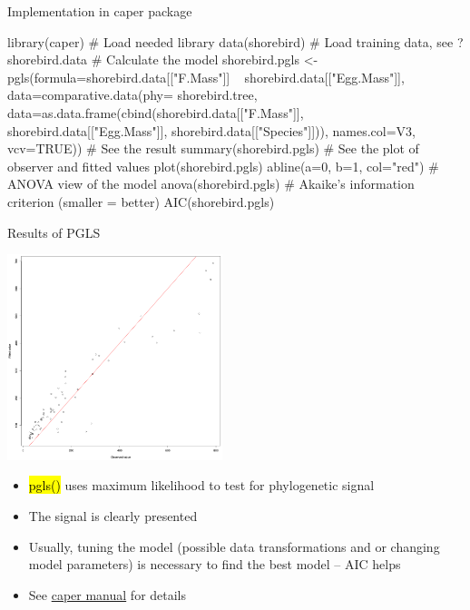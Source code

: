 \documentclass[compress, ucs, xelatex, 11pt, xcolor=svgnames,
  hyperref={
    bookmarks=true,
    unicode=true,
    colorlinks=true,
    pdftitle={Molecular data in R},
    plainpages=false,
    pdfauthor={Vojtech Zeisek},
    pdfsubject={Course about phylogeny and evolution in R},
    pdfcreator={XeLaTeX},
    pdfkeywords={R, evolution, phylogeny, molecular data},
    linkcolor=Tomato,
    anchorcolor=SaddleBrown,
    citecolor=Goldenrod,
    filecolor=DarkMagenta,
    menucolor=Sienna,
    urlcolor=DarkTurquoise,
    pdftex},
  url={hyphens, lowtilde} %
  ]{beamer}
\renewcommand{\texttt}[1]{\hl{\ttfamily #1}}
\begin{document}
\begin{frame}[fragile]{Implementation in caper package}
  \begin{spluscode}
    library(caper) # Load needed library
    data(shorebird) # Load training data, see ?shorebird.data
    # Calculate the model
    shorebird.pgls <- pgls(formula=shorebird.data[["F.Mass"]] ~
      shorebird.data[["Egg.Mass"]], data=comparative.data(phy=
      shorebird.tree, data=as.data.frame(cbind(shorebird.data[["F.Mass"]],
      shorebird.data[["Egg.Mass"]], shorebird.data[["Species"]])),
      names.col=V3, vcv=TRUE))
    # See the result
    summary(shorebird.pgls)
    # See the plot of observer and fitted values
    plot(shorebird.pgls)
    abline(a=0, b=1, col="red")
    # ANOVA view of the model
    anova(shorebird.pgls)
    # Akaike's information criterion (smaller = better)
    AIC(shorebird.pgls)
  \end{spluscode}
\end{frame}

\begin{frame}[fragile]{Results of PGLS}
  \begin{multicols}{2}
    \includegraphics[height=6cm]{shorebirds.png}
    \begin{itemize}
      \item \texttt{pgls()} uses maximum likelihood to test for phylogenetic signal
      \item The signal is clearly presented
      \item Usually, tuning the model (possible data transformations and or changing model parameters) is necessary to find the best model -- AIC helps
      \item See \href{https://cran.r-project.org/web/packages/caper/index.html}{caper manual} for details
    \end{itemize}
  \end{multicols}
\end{frame}
\end{document}
